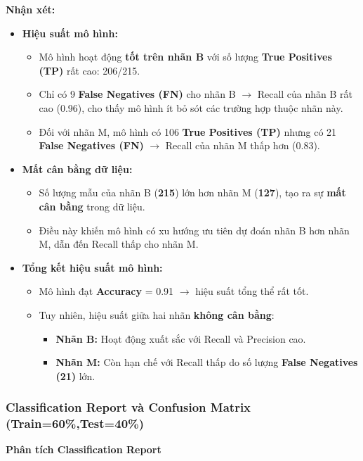 \textbf{Nhận xét:}
\begin{itemize}
	\item \textbf{Hiệu suất mô hình:}
	\begin{itemize}
		\item Mô hình hoạt động \textbf{tốt trên nhãn B} với số lượng \textbf{True Positives (TP)} rất cao: 206/215.
		\item Chỉ có 9 \textbf{False Negatives (FN)} cho nhãn B $\rightarrow$ Recall của nhãn B rất cao (0.96), cho thấy mô hình ít bỏ sót các trường hợp thuộc nhãn này.
		\item Đối với nhãn M, mô hình có 106 \textbf{True Positives (TP)} nhưng có 21 \textbf{False Negatives (FN)} $\rightarrow$ Recall của nhãn M thấp hơn (0.83).
	\end{itemize}
	
	\item \textbf{Mất cân bằng dữ liệu:}
	\begin{itemize}
		\item Số lượng mẫu của nhãn B (\textbf{215}) lớn hơn nhãn M (\textbf{127}), tạo ra sự \textbf{mất cân bằng} trong dữ liệu.
		\item Điều này khiến mô hình có xu hướng ưu tiên dự đoán nhãn B hơn nhãn M, dẫn đến Recall thấp cho nhãn M.
	\end{itemize}
	
	\item \textbf{Tổng kết hiệu suất mô hình:}
	\begin{itemize}
		\item Mô hình đạt \textbf{Accuracy} = 0.91 $\rightarrow$ hiệu suất tổng thể rất tốt.
		\item Tuy nhiên, hiệu suất giữa hai nhãn \textbf{không cân bằng}:
		\begin{itemize}
			\item \textbf{Nhãn B:} Hoạt động xuất sắc với Recall và Precision cao.
			\item \textbf{Nhãn M:} Còn hạn chế với Recall thấp do số lượng \textbf{False Negatives (21)} lớn.
		\end{itemize}
	\end{itemize}
\end{itemize}


\subsubsection{Classification Report và Confusion Matrix (Train=60\%,Test=40\%)}

\textbf{Phân tích Classification Report}

